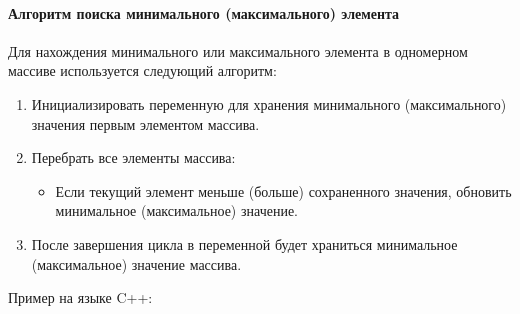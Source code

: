 \documentclass[
]{article}
\providecommand{\tightlist}{%
  \setlength{\itemsep}{0pt}\setlength{\parskip}{0pt}}
\begin{document}
\paragraph{Алгоритм поиска минимального (максимального)
элемента}\label{ux430ux43bux433ux43eux440ux438ux442ux43c-ux43fux43eux438ux441ux43aux430-ux43cux438ux43dux438ux43cux430ux43bux44cux43dux43eux433ux43e-ux43cux430ux43aux441ux438ux43cux430ux43bux44cux43dux43eux433ux43e-ux44dux43bux435ux43cux435ux43dux442ux430}

Для нахождения минимального или максимального элемента в одномерном
массиве используется следующий алгоритм:

\begin{enumerate}
\def\labelenumi{\arabic{enumi}.}
\tightlist
\item
  Инициализировать переменную для хранения минимального (максимального)
  значения первым элементом массива.
\item
  Перебрать все элементы массива:

  \begin{itemize}
  \tightlist
  \item
    Если текущий элемент меньше (больше) сохраненного значения, обновить
    минимальное (максимальное) значение.
  \end{itemize}
\item
  После завершения цикла в переменной будет храниться минимальное
  (максимальное) значение массива.
\end{enumerate}

Пример на языке C++:
\end{document}
